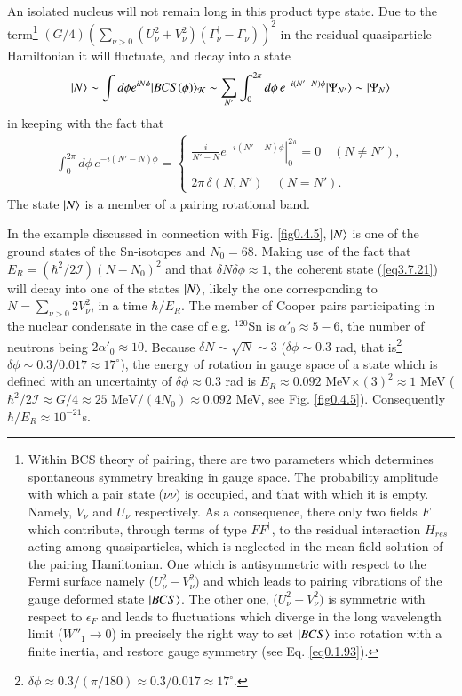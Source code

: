 An isolated nucleus will not remain long in this product type state. Due to the term\footnote{Within BCS theory of pairing, there are two parameters which determines spontaneous symmetry breaking in gauge space. The probability amplitude with which a pair state ($\nu\bar{\nu}$) is occupied, and that with which it is empty. Namely, $V_\nu$ and $U_\nu$ respectively. As a consequence, there only two fields $F$ which contribute, through terms of type $FF^\dagger$, to the residual interaction $H_{res}$ acting among quasiparticles, which is neglected in the mean field solution of the pairing Hamiltonian. One which is antisymmetric with respect to the Fermi surface namely ($U^2_\nu-V^2_\nu)$ and which leads to pairing vibrations of the gauge deformed state $|{BCS} \rangle$. The other one, ($U^2_\nu+V^2_\nu)$ is symmetric with respect to $\epsilon_F$ and leads to fluctuations which diverge in the long wavelength limit ($W''_1\to0$) in precisely the right way to set $|{BCS} \rangle$ into rotation with a finite inertia, and restore gauge symmetry (see Eq. \ref{eq0.1.93}).}  $(G/4)\left(\sum_{\nu>0}\left(U^2_\nu+V^2_\nu\right)\left(\Gamma_\nu^\dagger-\Gamma_\nu\right)\right)^2$ in the residual quasiparticle Hamiltonian it will fluctuate, and decay into a state
\begin{align}\label{eqbeta}
|N\rangle \sim \int d\phi e^{iN\phi}|BCS(\phi)\rangle_{\mathcal{K}}\sim \sum_{N'}\int_0^{2\pi}d\phi\, e^{-i(N'-N)\phi}|{\Psi_{N'}} \rangle\sim|{\Psi_{N}} \rangle
\end{align}
in keeping with the fact that
\begin{align}\label{eq3.7.27}
\int_0^{2\pi}d\phi\, e^{-i(N'-N)\phi}=\left\{
\begin{array}{l}
\left.\frac{i}{N'-N}e^{-i(N'-N)\phi}\right|^{2\pi}_0=0\quad (N\neq N'),\\ 
 \\
 2\pi\,\delta(N,N')\quad (N= N').
\end{array} \right.
\end{align}
The state $|{N} \rangle$ is a member of a pairing rotational band.  

In the example discussed in connection with Fig.  \ref{fig0.4.5}, $|{N} \rangle$ is one of the ground states of the Sn-isotopes and $N_0=68$. Making use of the fact that $E_R=\left(\hbar^2/2\mathcal I\right)(N-N_0)^2$ and that $\delta N\delta\phi\approx1$, the coherent state (\ref{eq3.7.21}) will decay into one of the states $|{N} \rangle$, likely the one corresponding to $N=\sum_{\nu>0}2V_\nu^2$, in a time $\hbar/E_R$. The member of  Cooper pairs participating in the nuclear condensate in the case of e.g. $^{120}$Sn is $\alpha'_0\approx5-6$, the number of neutrons being $2\alpha'_0\approx10$. Because $\delta N\sim\sqrt{N}\sim3$ ($\delta\phi\sim0.3$ rad, that is\footnote{$\delta\phi\approx0.3/(\pi/180)\approx0.3/0.017\approx17^\circ$.} $\delta\phi\sim0.3/0.017\approx 17^\circ$), the energy of rotation in gauge space of a state which is defined with an uncertainty of $\delta\phi\approx0.3$ rad is  $E_R\approx0.092$ MeV$\times(3)^2\approx 1$ MeV ($\hbar^2/2\mathcal I\approx G/4\approx 25\text{ MeV}/(4N_0)\approx0.092$ MeV, see Fig. \ref{fig0.4.5}). Consequently $\hbar/E_R\approx10^{-21}$s. 


